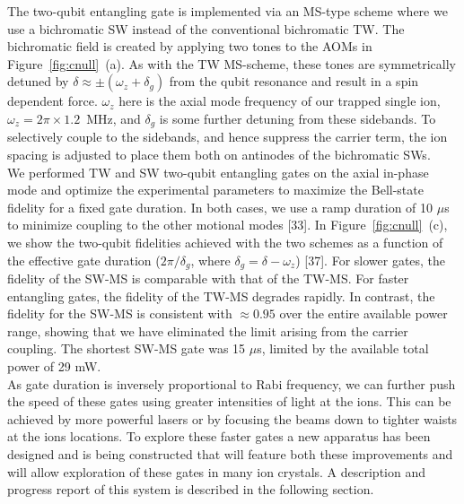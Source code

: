 \documentclass[12pt]{iopart}
\begin{document}
    The two-qubit entangling gate is implemented via an MS-type scheme
    where we use a bichromatic SW instead of the conventional
    bichromatic TW. The bichromatic field is created by applying two
    tones to the AOMs in Figure~\ref{fig:cnull}~(a). As with the TW MS-scheme, these
    tones are symmetrically detuned by $\delta \approx \pm(\omega_z + \delta_g) $ from the
    qubit resonance and result in a spin dependent force. $\omega_z$ here
    is the axial mode frequency of our trapped single ion,
    $\omega_z = 2\pi\times 1.2$~MHz, and $\delta_g$ is some further detuning
    from these sidebands. To selectively couple to the sidebands, and
    hence suppress the carrier term, the ion spacing is adjusted to
    place them both on antinodes of the bichromatic SWs.\\
    We performed TW and SW two-qubit entangling gates on the axial
    in-phase mode and optimize the experimental parameters to maximize
    the Bell-state fidelity for a fixed gate duration. In both cases,
    we use a ramp duration of 10 $\mu$s to minimize coupling to the other
    motional modes [33]. In Figure~\ref{fig:cnull}~(c), we show the two-qubit fidelities
    achieved with the two schemes as a function of the effective gate
    duration ($2\pi/\delta_g$, where $\delta_g = \delta - \omega_z$) [37]. For slower gates,
    the fidelity of the SW-MS is comparable with that of the
    TW-MS. For faster entangling gates, the fidelity of the TW-MS
    degrades rapidly.  In contrast, the fidelity for the SW-MS is
    consistent with $\approx 0.95$ over the entire available power range,
    showing that we have eliminated the limit arising from the carrier
    coupling. The shortest SW-MS gate was 15 $\mu$s, limited by the
    available total power of 29 mW. \\

    As gate duration is inversely proportional to Rabi frequency, we
    can further push the speed of these gates using greater
    intensities of light at the ions. This can be achieved by more
    powerful lasers or by focusing the beams down to tighter waists at
    the ions locations. To explore these faster gates a new apparatus
    has been designed and is being constructed that will feature both
    these improvements and will allow exploration of these gates in
    many ion crystals. A description and progress report of this
    system is described in the following section.\\
\end{document}
